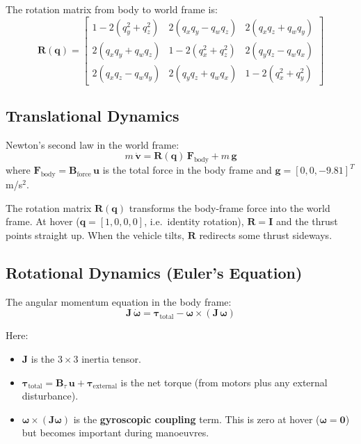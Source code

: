 \documentclass[12pt, a4paper]{article}
\newcommand{\bu}{\bm{u}}
\newcommand{\bq}{\bm{q}}
\newcommand{\bomega}{\bm{\omega}}
\newcommand{\btau}{\bm{\tau}}
\newcommand{\bF}{\bm{F}}
\newcommand{\bJ}{\bm{J}}
\newcommand{\bB}{\bm{B}}
\newcommand{\bI}{\bm{I}}
\begin{document}
The rotation matrix from body to world frame is:
\begin{equation}
    \bm{R}(\bq) = \begin{bmatrix}
        1 - 2(q_y^2 + q_z^2) & 2(q_x q_y - q_w q_z) & 2(q_x q_z + q_w q_y) \\
        2(q_x q_y + q_w q_z) & 1 - 2(q_x^2 + q_z^2) & 2(q_y q_z - q_w q_x) \\
        2(q_x q_z - q_w q_y) & 2(q_y q_z + q_w q_x) & 1 - 2(q_x^2 + q_y^2)
    \end{bmatrix}
\end{equation}

\subsection{Translational Dynamics}

Newton's second law in the world frame:
\begin{equation}
    m \, \dot{\bm{v}} = \bm{R}(\bq) \, \bF_{\text{body}} + m \, \bm{g}
    \label{eq:trans_dyn}
\end{equation}
where $\bF_{\text{body}} = \bB_{\text{force}} \, \bu$ is the total force in the body frame and $\bm{g} = [0, 0, -9.81]^T$ m/s$^2$.

The rotation matrix $\bm{R}(\bq)$ transforms the body-frame force into the world frame.  At hover ($\bq = [1,0,0,0]$, i.e.\ identity rotation), $\bm{R} = \bI$ and the thrust points straight up.  When the vehicle tilts, $\bm{R}$ redirects some thrust sideways.

\subsection{Rotational Dynamics (Euler's Equation)}

The angular momentum equation in the body frame:
\begin{equation}
    \bJ \, \dot{\bomega} = \btau_{\text{total}} - \bomega \times (\bJ \, \bomega)
    \label{eq:euler_eq}
\end{equation}

Here:
\begin{itemize}
    \item $\bJ$ is the $3 \times 3$ inertia tensor.
    \item $\btau_{\text{total}} = \bB_\tau \, \bu + \btau_{\text{external}}$ is the net torque (from motors plus any external disturbance).
    \item $\bomega \times (\bJ \bomega)$ is the \textbf{gyroscopic coupling} term.  This is zero at hover ($\bomega = \bm{0}$) but becomes important during manoeuvres.
\end{itemize}
\end{document}

